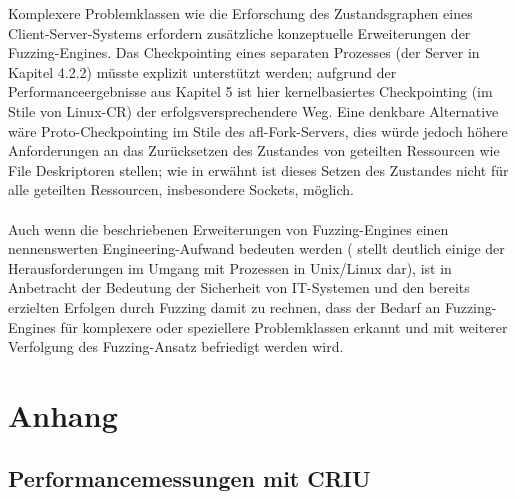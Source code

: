 \documentclass[a4paper]{article}
\begin{document}
Komplexere Problemklassen wie die Erforschung des Zustandsgraphen eines Client-Server-Systems erfordern zusätzliche konzeptuelle Erweiterungen der Fuzzing-Engines.
Das Checkpointing eines separaten Prozesses (der Server in Kapitel 4.2.2) müsste explizit unterstützt werden; aufgrund der Performanceergebnisse aus Kapitel 5 ist hier kernelbasiertes Checkpointing (im Stile von Linux-CR) der erfolgsversprechendere Weg.
Eine denkbare Alternative wäre Proto-Checkpointing im Stile des afl-Fork-Servers, dies würde jedoch höhere Anforderungen an das Zurücksetzen des Zustandes von geteilten Ressourcen wie File Deskriptoren stellen; wie in \cite{aflrestore} erwähnt ist dieses Setzen des Zustandes nicht für alle geteilten Ressourcen, insbesondere Sockets, möglich.\\ \\

Auch wenn die beschriebenen Erweiterungen von Fuzzing-Engines einen nennenswerten Engineering-Aufwand bedeuten werden (\cite{aflrestore} stellt deutlich einige der Herausforderungen im Umgang mit Prozessen in Unix/Linux dar), ist in Anbetracht der Bedeutung der Sicherheit von IT-Systemen und den bereits erzielten Erfolgen durch Fuzzing damit zu rechnen, dass der Bedarf an Fuzzing-Engines für komplexere oder speziellere Problemklassen erkannt und mit weiterer Verfolgung des Fuzzing-Ansatz befriedigt werden wird.


\section*{Anhang}
\subsection*{Performancemessungen mit CRIU}
%

\end{document}
